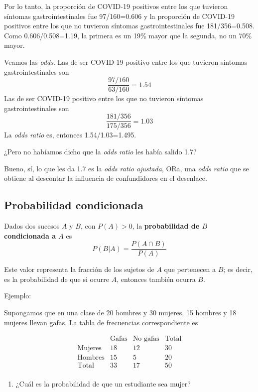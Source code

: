 \documentclass[
  spanish,
  letterpaper,
  DIV=11,
  numbers=noendperiod]{scrreprt}
\providecommand{\tightlist}{%
  \setlength{\itemsep}{0pt}\setlength{\parskip}{0pt}}
\begin{document}
\begin{tcolorbox}
Por lo tanto, la proporción de COVID-19 positivos entre los que tuvieron
síntomas gastrointestinales fue 97/160=0.606 y la proporción de COVID-19
positivos entre los que no tuvieron síntomas gastrointestinales fue
181/356=0.508. Como 0.606/0.508=1.19, la primera es un 19\% mayor que la
segunda, no un 70\% mayor.

Veamos las \emph{odds}. Las de ser COVID-19 positivo entre los que
tuvieron síntomas gastrointestinales son \[
\frac{97/160}{63/160}=1.54
\] Las de ser COVID-19 positivo entre los que no tuvieron síntomas
gastrointestinales son \[
\frac{181/356}{175/356}=1.03
\] La \emph{odds ratio} es, entonces 1.54/1.03=1.495.

¿Pero no habíamos dicho que la \emph{odds ratio} les había salido 1.7?

Bueno, sí, lo que les da 1.7 es la \emph{odds ratio ajustada}, ORa, una
\emph{odds ratio} que se obtiene al descontar la influencia de
confundidores en el desenlace.

\subsection{Probabilidad condicionada}\label{probabilidad-condicionada}

Dados dos sucesos \(A\) y \(B\), con \(P(A)>0\), la \textbf{probabilidad
de \(B\) condicionada a \(A\)} es \[
P(B|A)=\frac{P(A\cap B)}{P(A)}
\]

Este valor representa la fracción de los sujetos de \(A\) que pertenecen
a \(B\); es decir, es la probabilidad de que si ocurre \(A\), entonces
también ocurra \(B\).

Ejemplo:

Supongamos que en una clase de 20 hombres y 30 mujeres, 15 hombres y 18
mujeres llevan gafas. La tabla de frecuencias correspondiente es

\[
\begin{array}{r|c|c|c}
& \text{Gafas} & \text{No gafas} & \text{Total}\\ \hline
\text{Mujeres} & 18 &12  & 30\\ \hline
\text{Hombres} & 15 & 5 & 20 \\ \hline
\text{Total} & 33 & 17 &  50 \\ 
\end{array}
\]

\begin{enumerate}
\def\labelenumi{\arabic{enumi}.}
\tightlist
\item
  ¿Cuál es la probabilidad de que un estudiante sea mujer?
\end{enumerate}


\end{tcolorbox}
\end{document}
